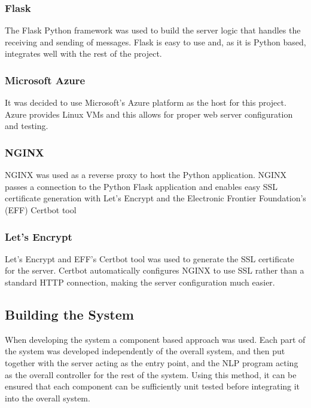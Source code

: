 \documentclass[12pt,a4paper]{article}
\begin{document}
    \subsubsection*{Flask}
    The Flask Python framework was used to build the server logic that handles the receiving and sending of messages. Flask is easy to use and, as it is Python based, integrates well with the rest of the project.
    
    \subsubsection*{Microsoft Azure}
    It was decided to use Microsoft's Azure platform as the host for this project. Azure provides Linux VMs and this allows for proper web server configuration and testing.
    
    \subsubsection*{NGINX}
    NGINX was used as a reverse proxy to host the Python application. NGINX passes a connection to the Python Flask application and enables easy SSL certificate generation with Let's Encrypt and the Electronic Frontier Foundation's (EFF) Certbot tool %
    
    \subsubsection*{Let's Encrypt}
    Let's Encrypt and EFF's Certbot tool was used to generate the SSL certificate for the server. Certbot automatically configures NGINX to use SSL rather than a standard HTTP connection, making the server configuration much easier.
    
    \subsection{Building the System}
    When developing the system a component based approach was used. Each part of the system was developed independently of the overall system, and then put together with the server acting as the entry point, and the NLP program acting as the overall controller for the rest of the system. Using this method, it can be ensured that each component can be sufficiently unit tested before integrating it into the overall system.
    
\end{document}
